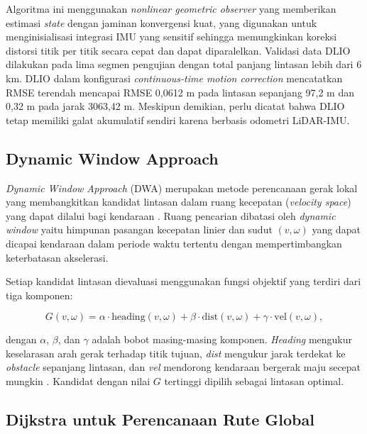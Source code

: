 Algoritma ini menggunakan \emph{nonlinear geometric observer} yang memberikan estimasi \emph{state} dengan jaminan konvergensi kuat, yang digunakan untuk menginisialisasi integrasi IMU yang sensitif sehingga memungkinkan koreksi distorsi titik per titik secara cepat dan dapat diparalelkan.
Validasi data DLIO dilakukan pada lima segmen pengujian dengan total panjang lintasan lebih dari 6 km.
DLIO dalam konfigurasi \emph{continuous-time motion correction} mencatatkan RMSE terendah mencapai RMSE 0,0612 m pada lintasan sepanjang 97,2 m dan 0,32 m pada jarak 3063,42 m.
Meskipun demikian, perlu dicatat bahwa DLIO tetap memiliki galat akumulatif sendiri karena berbasis odometri LiDAR-IMU.

\subsection{Dynamic Window Approach}
\label{subsec:dwa}

\emph{Dynamic Window Approach} (DWA) merupakan metode perencanaan gerak lokal yang membangkitkan kandidat lintasan dalam ruang kecepatan (\emph{velocity space}) yang dapat dilalui bagi kendaraan \parencite{Cao2025SOADWA}. Ruang pencarian dibatasi oleh \emph{dynamic window} yaitu himpunan pasangan kecepatan linier dan sudut $(v, \omega)$ yang dapat dicapai kendaraan dalam periode waktu tertentu dengan mempertimbangkan keterbatasan akselerasi.

Setiap kandidat lintasan dievaluasi menggunakan fungsi objektif yang terdiri dari tiga komponen:

\begin{equation}
G(v, \omega) = \alpha \cdot \text{heading}(v, \omega) + \beta \cdot \text{dist}(v, \omega) + \gamma \cdot \text{vel}(v, \omega),
\label{eq:dwa_original}
\end{equation}

dengan $\alpha$, $\beta$, dan $\gamma$ adalah bobot masing-masing komponen. \emph{Heading} mengukur keselarasan arah gerak terhadap titik tujuan, \emph{dist} mengukur jarak terdekat ke \emph{obstacle} sepanjang lintasan, dan \emph{vel} mendorong kendaraan bergerak maju secepat mungkin \parencite{Cao2025SOADWA}. Kandidat dengan nilai $G$ tertinggi dipilih sebagai lintasan optimal.

\subsection{Dijkstra untuk Perencanaan Rute Global}
\label{subsec:global-planning}

